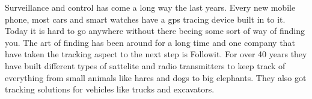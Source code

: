 

Surveillance and control has come a long way the last years. Every new mobile phone, most cars and smart watches have a \gls{gps} tracing device built in to it. Today it is hard to go anywhere without there beeing some sort of way of finding you. The art of finding has been around for a long time and one company that have taken the tracking aspect to the next step is Followit. For over 40 years they have built different types of sattelite and radio transmitters to keep track of everything from small animals like hares and dogs to big elephants. They also got tracking solutions for vehicles like trucks and excavators. 


\thispagestyle{empty}
